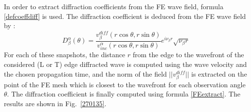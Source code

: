 In order to extract diffraction coefficients from the FE wave field, formula \eqref{defcoeffdiff} is used. The diffraction coefficient is deduced from the FE wave field by :
\begin{equation}
D_{\beta}^{\alpha}(\theta)=\frac{v^{diff}_{\beta}(r\cos\theta,r\sin\theta)}{v_{inc}^{\alpha}(r\cos\theta,r\sin\theta)}e^{i\nu_{\beta}r}\sqrt{\nu_{\beta}r}
\label{FEextract}
\end{equation}
For each of these snapshots, the distance $r$ from the edge to the wavefront of the considered (L or T) edge diffracted wave is computed using the wave velocity and the chosen propagation time, and the norm of the field $||v^{diff}_{\beta}||$ is extracted on the point of the FE mesh which is closest to the wavefront for each observation angle $\theta$. The diffraction coefficient is finally computed using formula \eqref{FEextract}. The results are shown in Fig.~\ref{270135}.
%
%

